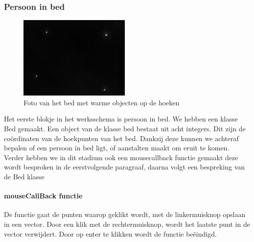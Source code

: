 \subsubsection{Persoon in bed}
\begin{figure}[hbp]
	\includegraphics[scale=0.75]{SeekCamBed}
	\caption{Foto van het bed met warme objecten op de hoeken}
	\label{imgCBe}
\end{figure}
Het eerste blokje in het werksschema is persoon in bed. We hebben een klasse Bed gemaakt. Een object van de klasse bed bestaat uit acht integers. Dit zijn de co\"ordinaten van de hoekpunten van het bed. Dankzij deze kunnen we achteraf bepalen of een persoon in bed ligt, of aanstalten maakt om eruit te komen. Verder hebben we in dit stadium ook een mousecallback functie gemaakt deze wordt besproken in de eerstvolgende paragraaf, daarna volgt een bespreking van de Bed klasse \\

\paragraph{mouseCallBack functie}
 De functie gaat de punten waarop geklikt wordt, met de linkermuisknop opslaan in een vector. Door een klik met de rechtermuisknop, wordt het laatste punt in de vector verwijdert. Door op enter te klikken wordt de functie be\"eindigd. 
 
